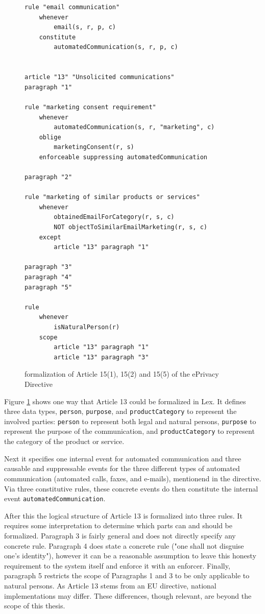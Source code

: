 \begin{figure}
\begin{minipage}{0.6\textwidth}
\begin{lstlisting}[firstnumber=51]
rule "email communication"
    whenever
        email(s, r, p, c)
    constitute
        automatedCommunication(s, r, p, c)


article "13" "Unsolicited communications"
paragraph "1"

rule "marketing consent requirement"
    whenever
        automatedCommunication(s, r, "marketing", c)
    oblige
        marketingConsent(r, s)
    enforceable suppressing automatedCommunication

paragraph "2"

rule "marketing of similar products or services"
    whenever
        obtainedEmailForCategory(r, s, c)
        NOT objectToSimilarEmailMarketing(r, s, c)
    except
        article "13" paragraph "1"

paragraph "3"
paragraph "4"
paragraph "5"

rule 
    whenever
        isNaturalPerson(r)
    scope
        article "13" paragraph "1"
        article "13" paragraph "3"
\end{lstlisting}
\end{minipage}
\caption{\Lex{} formalization of Article 15(1), 15(2) and 15(5) of the ePrivacy Directive
\label{fig:lex-article-13}}
\end{figure}

Figure \ref{fig:lex-article-13} shows one way that
Article 13 could be formalized in Lex.
It defines three data types, \texttt{person}, \texttt{purpose}, and
\texttt{productCategory} to represent the involved parties:
\texttt{person} to represent both legal and natural persons,
\texttt{purpose} to represent the purpose of the communication,
and \texttt{productCategory} to represent the category of the product
or service.

Next it specifies one internal event for automated communication
and three causable and suppressable events for the
three different types of automated communication
(automated calls, faxes, and e-mails), mentionend in
the directive.
Via three constitutive rules, these concrete
events do then constitute the internal event
\texttt{automatedCommunication}.

After this the logical structure of Article 13
is formalized into three rules.
It requires some interpretation to determine
which parts can and should be formalized.
Paragraph 3 is fairly general and does not
directly specify any concrete rule.
Paragraph 4 does state
a concrete rule ("one shall not disguise one's identity"),
however it can be a reasonable assumption to leave this
honesty requirement to the system itself and enforce
it with an enforcer.
Finally, paragraph 5 restricts the scope of Paragraphs
1 and 3 to be only applicable to natural persons.
As Article 13 stems from an EU directive, national implementations may differ.
These differences, though relevant, are beyond the scope of this thesis.

